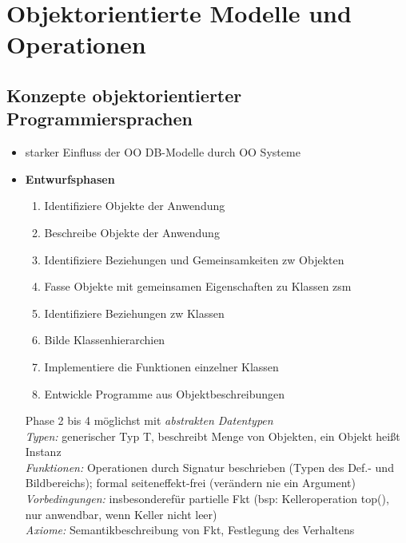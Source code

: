 \section{Objektorientierte Modelle und Operationen}

\subsection{Konzepte objektorientierter Programmiersprachen}
\begin{itemize}
	\item starker Einfluss der OO DB-Modelle durch OO Systeme
	\item \textbf{Entwurfsphasen}
	\begin{enumerate}
		\item Identifiziere Objekte der Anwendung
		\item Beschreibe Objekte der Anwendung
		\item Identifiziere Beziehungen und Gemeinsamkeiten zw Objekten
		\item Fasse Objekte mit gemeinsamen Eigenschaften zu Klassen zsm
		\item Identifiziere Beziehungen zw Klassen
		\item Bilde Klassenhierarchien
		\item Implementiere die Funktionen einzelner Klassen
		\item Entwickle Programme aus Objektbeschreibungen
	\end{enumerate}
	Phase 2 bis 4 möglichst mit \textit{abstrakten Datentypen}\\
	\textit{Typen:} generischer Typ T, beschreibt Menge von Objekten, ein Objekt heißt Instanz\\
	\textit{Funktionen:} Operationen durch Signatur beschrieben (Typen des Def.- und Bildbereichs); formal seiteneffekt-frei (verändern nie ein Argument)\\
	\textit{Vorbedingungen:} insbesonderefür partielle Fkt (bsp: Kelleroperation top(), nur anwendbar, wenn Keller nicht leer)\\
	\textit{Axiome:} Semantikbeschreibung von Fkt, Festlegung des Verhaltens 
\end{itemize}

